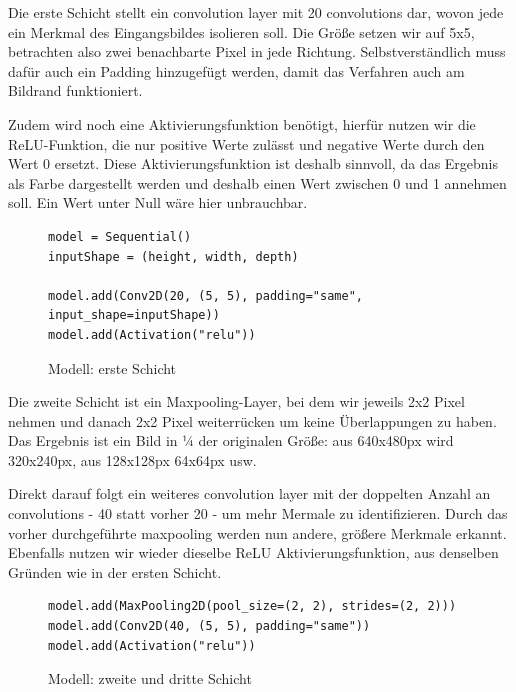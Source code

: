 \documentclass[conference]{IEEEtran}
\begin{document}
	Die erste Schicht stellt ein convolution layer mit 20 convolutions dar, wovon jede ein Merkmal des Eingangsbildes isolieren soll.
	Die Größe setzen wir auf 5x5, betrachten also zwei benachbarte Pixel in jede Richtung.
	Selbstverständlich muss dafür auch ein Padding hinzugefügt werden, damit das Verfahren auch am Bildrand funktioniert. 
	
	Zudem wird noch eine Aktivierungsfunktion benötigt, hierfür nutzen wir die ReLU-Funktion, die nur positive Werte zulässt und negative Werte durch den Wert 0 ersetzt.
	Diese Aktivierungsfunktion ist deshalb sinnvoll, da das Ergebnis als Farbe dargestellt werden und deshalb einen Wert zwischen 0 und 1 annehmen soll.
	Ein Wert unter Null wäre hier unbrauchbar.
	
	\begin{figure}[!h]
		\centering
		\begin{verbatim}
model = Sequential()
inputShape = (height, width, depth)

model.add(Conv2D(20, (5, 5), padding="same", input_shape=inputShape))
model.add(Activation("relu"))
		\end{verbatim}
		\caption{Modell: erste Schicht}
		\label{Schicht eins}
	\end{figure}
	
	Die zweite Schicht ist ein Maxpooling-Layer, bei dem wir jeweils 2x2 Pixel nehmen und danach 2x2 Pixel weiterrücken um keine Überlappungen zu haben.
	Das Ergebnis ist ein Bild in ¼ der originalen Größe: aus 640x480px wird 320x240px, aus 128x128px 64x64px usw.
	
	Direkt darauf folgt ein weiteres convolution layer mit der doppelten Anzahl an convolutions - 40 statt vorher 20 - um mehr Mermale zu identifizieren.
	Durch das vorher durchgeführte maxpooling werden nun andere, größere Merkmale erkannt.
	Ebenfalls nutzen wir wieder dieselbe ReLU Aktivierungsfunktion, aus denselben Gründen wie in der ersten Schicht.
	
	\begin{figure}[!h]
		\centering
		\begin{verbatim}
model.add(MaxPooling2D(pool_size=(2, 2), strides=(2, 2)))
model.add(Conv2D(40, (5, 5), padding="same"))
model.add(Activation("relu"))
		\end{verbatim}
		\caption{Modell: zweite und dritte Schicht}
		\label{Schicht zwei und drei}
	\end{figure}
	
	
\end{document}
